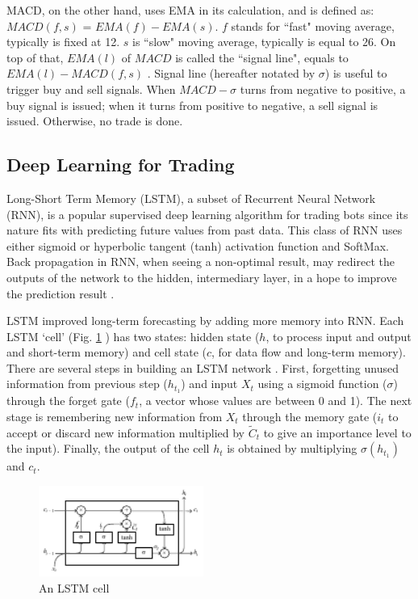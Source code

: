 MACD, on the other hand, uses EMA in its calculation, and is defined as: $MACD(f, s)$ = $EMA(f) - EMA(s)$. $f$ stands for ``fast" moving average, typically is fixed at 12. $s$ is ``slow" moving average, typically is equal to 26. On top of that, $EMA(l)$ of $MACD$ is called the ``signal line", equals to $EMA(l) - MACD(f, s)$ \cite{AT23}. Signal line (hereafter notated by $\sigma$) is useful to trigger buy and sell signals. When $MACD - \sigma$ turns from negative to positive, a buy signal is issued; when it turns from positive to negative, a sell signal is issued. Otherwise, no trade is done.

\subsection{Deep Learning for Trading}
\label{sec:dl}
Long-Short Term Memory (LSTM), a subset of Recurrent Neural Network (RNN), is a popular supervised deep learning algorithm for trading bots since its nature fits with predicting future values from past data. This class of RNN uses either sigmoid or hyperbolic tangent (tanh) activation function and SoftMax. Back propagation in RNN, when seeing a non-optimal result, may redirect the outputs of the network to the hidden, intermediary layer, in a hope to improve the prediction result \cite{AT20}.

LSTM improved long-term forecasting by adding more memory into RNN. Each LSTM `cell' (Fig. \ref{fig:3lstm} \cite{NN05}) has two states: hidden state ($h$, to process input and output and short-term memory) and cell state ($c$, for data flow and long-term memory). There are several steps in building an LSTM network \cite{NN04}. First, forgetting unused information from previous step ($h_{t_1}$) and input $X_t$ using a sigmoid function ($\sigma$) through the forget gate ($f_t$, a vector whose values are between 0 and 1). The next stage is remembering new information from $X_t$ through the memory gate ($i_t$ to accept or discard new information multiplied by $\tilde{C}_t$ to give an importance level to the input). Finally, the output of the cell $h_t$ is obtained by multiplying $\sigma(h_{t_1})$ and $c_t$.

\begin{figure}[h]
    \centering
    \includegraphics[width=0.48\textwidth]{graphics/3lstm.pdf}
    \caption{An LSTM cell}
    \label{fig:3lstm}
\end{figure}


